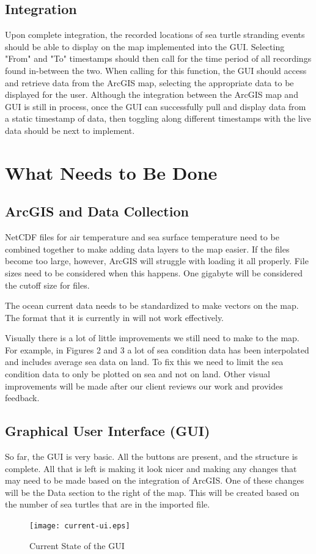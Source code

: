 \documentclass[onecolumn, draftclsnofoot,10pt, compsoc]{IEEEtran}
\begin{document}
\subsection{Integration}

Upon complete integration, the recorded locations of sea turtle stranding events should be able to display on the map implemented into the GUI. Selecting "From" and "To" timestamps should then call for the time period of all recordings found in-between the two. When calling for this function, the GUI should access and retrieve data from the ArcGIS map, selecting the appropriate data to be displayed for the user. Although the integration between the ArcGIS map and GUI is still in process, once the GUI can successfully pull and display data from a static timestamp of data, then toggling along different timestamps with the live data should be next to implement.

\section{What Needs to Be Done}

\subsection{ArcGIS and Data Collection} 
\par NetCDF files for air temperature and sea surface temperature need to be combined together to make adding data layers to the map easier.  If the files become too large, however, ArcGIS will struggle with loading it all properly.  File sizes need to be considered when this happens.  One gigabyte will be considered the cutoff size for files.
\par The ocean current data needs to be standardized to make vectors on the map.  The format that it is currently in will not work effectively.

\par Visually there is a lot of little improvements we still need to make to the map. For example, in Figures 2 and 3 a lot of sea condition data has been interpolated and includes average sea data on land. To fix this we need to limit the sea condition data to only be plotted on sea and not on land. Other visual improvements will be made after our client reviews our work and provides feedback. 

\subsection{Graphical User Interface (GUI)}
\par So far, the GUI is very basic. All the buttons are present, and the structure is complete. All that is left is making it look nicer and making any changes that may need to be made based on the integration of ArcGIS. One of these changes will be the Data section to the right of the map. This will be created based on the number of sea turtles that are in the imported file.
\begin{figure}[H]
  \texttt{[image: current-ui.eps]}
  \caption{Current State of the GUI}
\end{figure}
\end{document}
